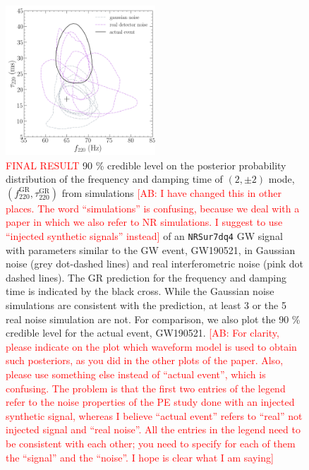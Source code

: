 \documentclass[twocolumn,prd,aps,superscriptaddress,preprintnumbers,tightenlines,showpacs,nofootinbib,eqsecnum,amsfonts,amsmath]{revtex4-1}
\newcommand{\comment}[1]{\textcolor{red}{[#1]}}
\newcommand{\fgr}[1]{f ^{\text{GR}}_{\text{#1}}}
\newcommand{\taugr}[1]{\tau ^{\text{GR}}_{\text{#1}}}
\begin{document}
\begin{figure}
\begin{center}
	\includegraphics[width=0.5\textwidth]{figures/S190521g_swinjs.png}
	\caption{\textcolor{red}{FINAL RESULT} 90 \% credible level on the posterior probability distribution of the frequency and damping time of $(2,\pm 2)$ mode, $(\fgr{220}, \taugr{220})$ from simulations \comment{AB: I have changed this in other places. The word ``simulations'' is confusing, because we deal with a paper in which we also refer to NR simulations. I suggest to use ``injected synthetic signals'' instead} of an \texttt{NRSur7dq4} GW signal with parameters similar to the GW event, GW190521, in Gaussian noise (grey dot-dashed lines) and real interferometric noise (pink dot dashed lines). The GR prediction for the frequency and damping time is indicated by the black cross. While the Gaussian noise simulations are consistent with the prediction, at least 3 or the 5 real noise simulation are not. For comparison, we also plot the 90 \% credible level for the actual event, GW190521. \comment{AB: For clarity, please indicate on the plot which waveform model is used to obtain such posteriors, as you did 
in the other plots of the paper. Also, please use something else instead of ``actual event'', which is confusing. The problem is 
that the first two entries of the legend refer to the noise properties of the PE study done with an injected synthetic signal, whereas I believe ``actual event'' refers to ``real'' not injected signal 
and ``real noise''. All the entries in the legend need to be consistent with each other; you need to specify for each of them the ``signal'' and the ``noise''. I hope is clear what I am saying}}
	\label{fig:21g_systematics}
\end{center}	
\end{figure}
\end{document}
